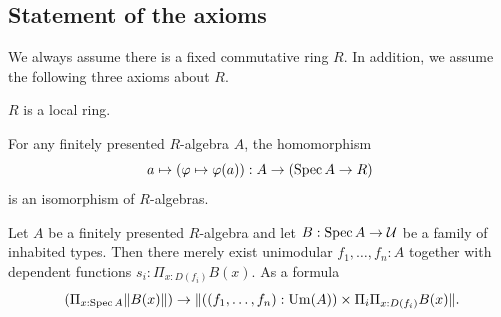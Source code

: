 \subsection{Statement of the axioms}%
\label{statement-of-axioms}

We always assume there is a fixed commutative ring $R$.
In addition, we assume the following three axioms about $R$.

\begin{axiom}[Loc]%
  \label{loc}
  $R$ is a local ring.
\end{axiom}

\begin{axiom}[SQC]%
  \label{sqc}
  For any finitely presented $R$-algebra $A$, the homomorphism
  \[ a \mapsto (\varphi\mapsto \varphi(a)) : A \to (\operatorname{Spec} A \to R)\]
  is an isomorphism of $R$-algebras.
\end{axiom}

\begin{axiom}[Z-choice]%
  \label{Z-choice}
  Let $A$ be a finitely presented $R$-algebra
  and let $B : \operatorname{Spec} A \to \mathcal{U}$ be a family of inhabited types.
  Then there merely exist unimodular $f_1, \dots, f_n : A$
  together with dependent functions $s_i : \Pi_{x : D(f_i)} B(x)$.
  As a formula
  \[ (\Pi_{x : \Spec A} \propTrunc{B(x)}) \to
     \propTrunc{ ((f_1,\dots,f_n):\Um(A)) \times
      \Pi_i \Pi_{x : D(f_i)} B(x) }
     \rlap{.}
  \]
\end{axiom}
